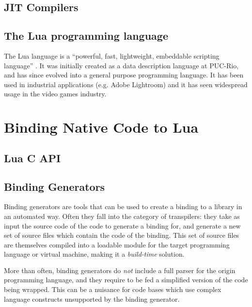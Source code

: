 \subsection{JIT Compilers}
	\label{sec:jit-compilers}


\subsection{The Lua programming language}
	\label{sec:lua-programming-lang}

The Lua language is a “powerful, fast, lightweight, embeddable scripting
language” \cite{lua-about}. It was initially created as a data description
language at \gls{PUC-Rio}, and has since evolved into
a general purpose programming language. It has been used in industrial
applications (e.g. Adobe Lightroom) and it has seen widespread usage in the
video games industry.

\section{Binding Native Code to Lua}

\subsection{Lua C API}
	\label{sec:lua-c-api}


\subsection{Binding Generators}

Binding generators are tools that can be used to create a binding to a library
in an automated way. Often they fall into the category of \glspl{transpiler}:
they take as input the source code of the code to generate a binding for,
and generate a new set of source files which contain the code of the binding.
This set of source files are themselves compiled into a loadable module for
the target programming language or virtual machine, making it a
\emph{build-time} solution.

More than often, binding generators do \emph{not} include a full parser for
the origin programming language, and they require to be fed a simplified
version of the code being wrapped. This can be a nuisance for code bases which
use complex language constructs unsupported by the binding generator.

%


